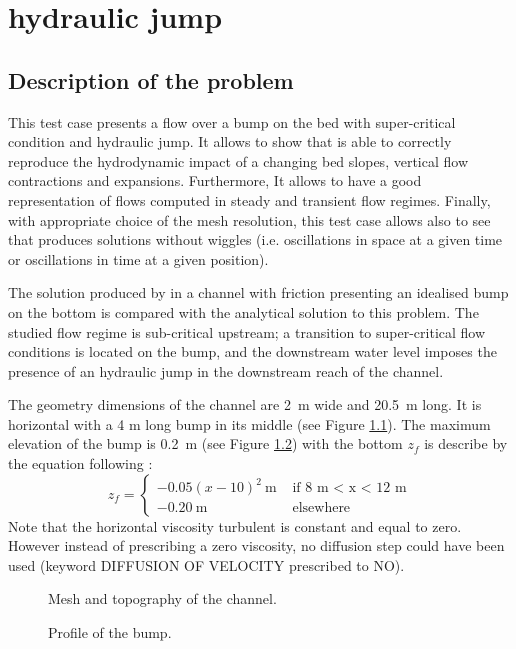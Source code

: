 \chapter{hydraulic jump}


\section{Description of the problem}
\bigskip
This test case presents a flow over a bump on the bed with 
super-critical condition and hydraulic jump.
It allows to show that  is able to correctly reproduce 
the hydrodynamic impact of a changing bed slopes, vertical flow 
contractions and expansions. Furthermore, It allows to have a good 
representation of flows computed in steady and transient flow regimes. 
Finally, with appropriate choice of the mesh resolution, this test case 
allows also to see that  produces solutions without wiggles 
(i.e. oscillations in space at a given time or oscillations in time 
at a given position). 

\bigskip
The solution produced by  in a channel with friction 
presenting an idealised bump on the bottom  is compared with 
the analytical solution to this problem. The studied flow regime is 
sub-critical upstream; a transition to super-critical flow conditions 
is located on the bump, and the downstream water level imposes the presence 
of an hydraulic jump in the downstream reach of the channel.

\bigskip
The geometry dimensions of the channel are 2~m wide and 20.5~m long. 
It is horizontal with a 4 m long bump in its middle 
(see Figure \ref{t2d:hydraulic_jump:fig:baty}). The maximum elevation 
of the bump is 0.2~m (see Figure \ref{t2d:hydraulic_jump:fig:profil}) 
with the bottom $z_f$ is describe by the equation following :
\begin{equation*}
z_f = \left\{
\begin{array}{rl}
-0.05(x-10)^2~\text{m}& \text{ if 8 m < x < 12 m} \\
-0.20~\text{m} & \text{ elsewhere}
\end{array}
\right.
\end{equation*}
Note that the horizontal viscosity turbulent is constant and equal to zero. 
However instead of prescribing a zero viscosity, no diffusion step 
could have been used (keyword DIFFUSION OF VELOCITY prescribed to NO).

\begin{figure}[!htbp]
 \centering
 \caption{Mesh and topography of the channel.}
 \label{t2d:hydraulic_jump:fig:baty}
\end{figure}
\begin{figure}[!htbp]
 \centering
 \caption{Profile of the bump.}
 \label{t2d:hydraulic_jump:fig:profil}
\end{figure}
